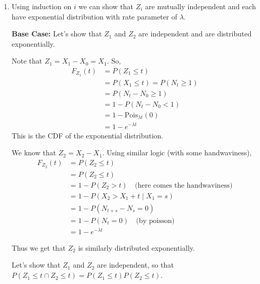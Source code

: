 \documentclass[12pt]{article}
\begin{document}

\begin{enumerate}[start=1,label={\bfseries Problem \arabic*:},leftmargin=1in] %
    \item Using induction on $i$ we can show that $Z_{i}$ are mutually independent and each have exponential distribution with rate parameter of $\lambda$. 
    
    \textbf{Base Case:} Let's show that $Z_{1}$ and $Z_{2}$ are independent and are distributed exponentially. 

    Note that $Z_{1} = X_{1} - X_{0} = X_{1}$. So, 
    \begin{align*}
        F_{Z_{1}}(t) &= P(Z_{1} \leq t) \\ 
        &= P(X_{1} \leq t) = P(N_{t} \geq 1) \\
        &= P(N_{t} - N_{0} \geq 1) \\ 
        &= 1 - P(N_{t} - N_{0} < 1) \\ 
        &= 1 - \text{Pois}_{\lambda t}(0)\\
        &= 1 - e^{-\lambda t}
    \end{align*}
    This is the CDF of the exponential distribution. 

    We know that $Z_{2} = X_{2} - X_{1}$. Using similar logic (with some handwaviness), 
    \begin{align*}
        F_{Z_{2}}(t) &= P(Z_{2} \leq t) \\
        &= P(Z_{2} \leq t) \\ 
        &= 1- P(Z_{2} > t) \quad \text{(here comes the handwaviness)}\\ 
        &= 1 - P(X_{2} > X_{1} + t \mid X_{1} = s) \\
        &= 1 - P(N_{t+s} - N_{s} = 0) \\ 
        &= 1 - P(N_{t} = 0) \quad \text{(by poisson)}\\
        &= 1 - e^{-\lambda t}
    \end{align*}

    Thus we get that $Z_{2}$ is similarly distributed exponentially. 

    Let's show that $Z_{1}$ and $Z_{2}$ are independent, so that $P(Z_{1} \leq t \cap Z_{2} \leq t) = P(Z_{1} \leq t)P(Z_{2} \leq t)$. 


\end{enumerate}
\end{document}
